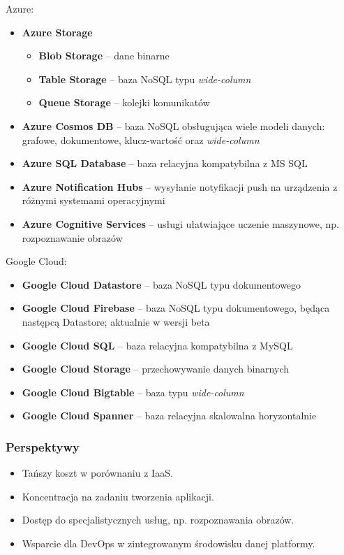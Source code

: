 \documentclass[12pt,a4paper,twoside,titlepage,openright]{book}
\begin{document}
\noindent
Azure:
\begin{itemize}
\item \textbf{Azure Storage}
	\begin{itemize}
		\item \textbf{Blob Storage} -- dane binarne
		\item \textbf{Table Storage} -- baza NoSQL typu \textit{wide-column}
		\item \textbf{Queue Storage} -- kolejki komunikatów
	\end{itemize}
\item \textbf{Azure Cosmos DB} -- baza NoSQL obsługująca wiele modeli danych: grafowe, dokumentowe, klucz-wartość oraz \textit{wide-column}
\item \textbf{Azure SQL Database} -- baza relacyjna kompatybilna z MS SQL
\item \textbf{Azure Notification Hubs} -- wysyłanie notyfikacji push na urządzenia z różnymi systemami operacyjnymi
\item \textbf{Azure Cognitive Services} -- usługi ułatwiające uczenie maszynowe, np. rozpoznawanie obrazów

\end{itemize}

\noindent
Google Cloud:
\begin{itemize}
\item \textbf{Google Cloud Datastore} -- baza NoSQL typu dokumentowego
\item \textbf{Google Cloud Firebase} -- baza NoSQL typu dokumentowego, będąca następcą Datastore; aktualnie w wersji beta
\item \textbf{Google Cloud SQL} -- baza relacyjna kompatybilna z MySQL
\item \textbf{Google Cloud Storage} -- przechowywanie danych binarnych
\item \textbf{Google Cloud Bigtable} -- baza typu \textit{wide-column}
\item \textbf{Google Cloud Spanner} -- baza relacyjna skalowalna horyzontalnie

\end{itemize}

\subsubsection{Perspektywy}
\begin{itemize}
\item Tańszy koszt w porównaniu z IaaS.
\item Koncentracja na zadaniu tworzenia aplikacji.
\item Dostęp do specjalistycznych usług, np. rozpoznawania obrazów.
\item Wsparcie dla DevOps w zintegrowanym środowisku danej platformy.
\end{itemize}
\end{document}
